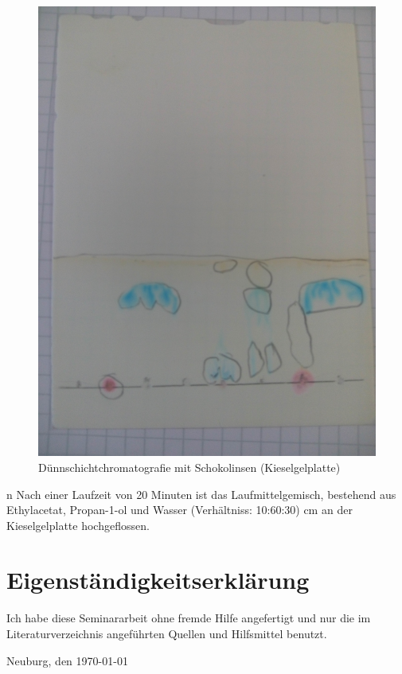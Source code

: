 \documentclass[11pt]{scrreprt}
\begin{document}
\begin{figure}[ht!]
	\centering
	\includegraphics[width=\textwidth]{kieselgel.jpg}
	\caption{Dünnschichtchromatografie mit Schokolinsen (Kieselgelplatte)}
	\label{img: Kieselgel}
\end{figure}n
Nach einer Laufzeit von 20 Minuten ist das Laufmittelgemisch, bestehend aus Ethylacetat, Propan-1-ol und Wasser (Verhältniss: 10:60:30) cm an der Kieselgelplatte hochgeflossen.


\printbibliography


\chapter*{Eigenständigkeitserklärung}

Ich habe diese Seminararbeit ohne fremde Hilfe angefertigt und nur die im Literaturverzeichnis angeführten Quellen und Hilfsmittel benutzt.

\vspace{2\baselineskip}
\noindent Neuburg, den \today
\par\noindent\makebox[2.5in]{} \hfill\makebox[2.0in]{\hrulefill}%
\par\noindent\makebox[2.5in][l]{} \hfill{}
\end{document}
